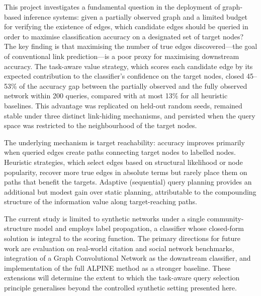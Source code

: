 \documentclass[11pt,a4paper]{article}
\begin{document}
This project investigates a fundamental question in the deployment of graph-based inference
systems: given a partially observed graph and a limited budget for verifying the existence of
edges, which candidate edges should be queried in order to maximise classification accuracy on
a designated set of target nodes? The key finding is that maximising the number of true edges
discovered---the goal of conventional link prediction---is a poor proxy for maximising
downstream accuracy. The task-aware value strategy, which scores each candidate edge by its
expected contribution to the classifier's confidence on the target nodes, closed 45--53\% of
the accuracy gap between the partially observed and the fully observed network within 200 queries,
compared with at most 13\% for all heuristic baselines. This advantage was replicated on
held-out random seeds, remained stable under three distinct link-hiding mechanisms, and
persisted when the query space was restricted to the neighbourhood of the target nodes.

The underlying mechanism is target reachability: accuracy improves primarily when queried edges
create paths connecting target nodes to labelled nodes. Heuristic strategies, which select
edges based on structural likelihood or node popularity, recover more true edges in absolute
terms but rarely place them on paths that benefit the targets. Adaptive (sequential) query
planning provides an additional but modest gain over static planning, attributable to the
compounding structure of the information value along target-reaching paths.

The current study is limited to synthetic networks under a single community-structure model and
employs label propagation, a classifier whose closed-form solution is integral to the scoring
function. The primary directions for future work are evaluation on real-world citation and
social network benchmarks, integration of a Graph Convolutional Network as the downstream
classifier, and implementation of the full ALPINE method as a stronger baseline. These extensions
will determine the extent to which the task-aware query selection principle generalises beyond
the controlled synthetic setting presented here.
\end{document}
